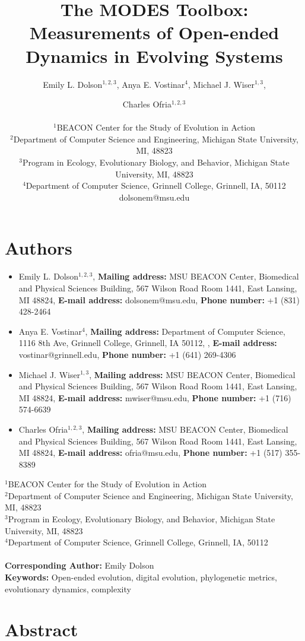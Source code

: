 \documentclass[letterpaper]{article}
\title{The MODES Toolbox: Measurements of Open-ended Dynamics in Evolving Systems}
\author{Emily L. Dolson$^{1,2,3}$, Anya E. Vostinar$^{4}$, Michael J. Wiser$^{1,3}$,\and Charles Ofria$^{1,2,3}$ \\
\mbox{}\\
$^1$BEACON Center for the Study of Evolution in Action  \\
$^2$Department of Computer Science and Engineering, Michigan State University, MI, 48823 \\
$^3$Program in Ecology, Evolutionary Biology, and Behavior, Michigan State University, MI, 48823 \\
$^4$Department of Computer Science, Grinnell College, Grinnell, IA, 50112 \\
dolsonem@msu.edu}
\begin{document}
\section{Authors}
\begin{spacing}{1}

\begin{itemize}
\item Emily L. Dolson$^{1,2,3}$, \textbf{Mailing address:} MSU BEACON Center, Biomedical and Physical Sciences Building, 567 Wilson Road Room 1441, East Lansing, MI 48824,  \textbf{E-mail address:} dolsonem@msu.edu,  \textbf{Phone number:} +1 (831) 428-2464
\item Anya E. Vostinar$^{4}$,  \textbf{Mailing address:} Department of Computer Science, 1116 8th Ave, Grinnell College, Grinnell, IA 50112, ,  \textbf{E-mail address:} vostinar@grinnell.edu,  \textbf{Phone number:} +1 (641) 269-4306
\item Michael J. Wiser$^{1,3}$,  \textbf{Mailing address:} MSU BEACON Center, Biomedical and Physical Sciences Building, 567 Wilson Road Room 1441, East Lansing, MI 48824,  \textbf{E-mail address:} mwiser@msu.edu,  \textbf{Phone number:} +1 (716) 574-6639 
\item Charles Ofria$^{1,2,3}$,  \textbf{Mailing address:} MSU BEACON Center, Biomedical and Physical Sciences Building, 567 Wilson Road Room 1441, East Lansing, MI 48824,  \textbf{E-mail address:} ofria@msu.edu,  \textbf{Phone number:} +1 (517) 355-8389
\end{itemize}
$^1$BEACON Center for the Study of Evolution in Action  \\
$^2$Department of Computer Science and Engineering, Michigan State University, MI, 48823 \\
$^3$Program in Ecology, Evolutionary Biology, and Behavior, Michigan State University, MI, 48823 \\
$^4$Department of Computer Science, Grinnell College, Grinnell, IA, 50112 \\
\\
\textbf{Corresponding Author:} Emily Dolson
\\
\textbf{Keywords:} Open-ended evolution, digital evolution, phylogenetic metrics, evolutionary dynamics, complexity

\end{spacing}

\section{Abstract}
\end{document}
